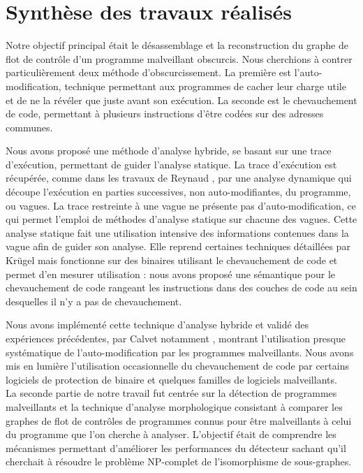 \section*{Synthèse des travaux réalisés}

Notre objectif principal était le désassemblage et la reconstruction du graphe de flot de contrôle d'un programme malveillant obscurcis.
Nous cherchions à contrer particulièrement deux méthode d'obscurcissement. 
La première est l'auto-modification, technique permettant aux programmes de cacher leur charge utile et de ne la révéler que juste avant son exécution. La seconde est le chevauchement de code, permettant à plusieurs instructions d'être codées sur des adresses communes.

Nous avons proposé une méthode d'analyse hybride, se basant sur une trace d'exécution, permettant de guider l'analyse statique.
La trace d'exécution est récupérée, comme dans les travaux de Reynaud \cite{Reynaud2010}, par une analyse dynamique qui découpe l'exécution en parties successives, non auto-modifiantes, du programme, ou vagues.
La trace restreinte à une vague ne présente pas d'auto-modification, ce qui permet l'emploi de méthodes d'analyse statique sur chacune des vagues.
Cette analyse statique fait une utilisation intensive des informations contenues dans la vague afin de guider son analyse.
Elle reprend certaines techniques détaillées par Krügel \cite{KruegelRVV04} mais fonctionne sur des binaires utilisant le chevauchement de code et permet d'en mesurer utilisation : nous avons proposé une sémantique pour le chevauchement de code rangeant les instructions dans des couches de code au sein desquelles il n'y a pas de chevauchement.

Nous avons implémenté cette technique d'analyse hybride et validé des expériences précédentes, par Calvet notamment \cite{Calvet2013}, montrant l'utilisation presque systématique de l'auto-modification par les programmes malveillants.
Nous avons mis en lumière l'utilisation occasionnelle du chevauchement de code par certains logiciels de protection de binaire et quelques familles de logiciels malveillants.
\\

La seconde partie de notre travail fut centrée sur la détection de programmes malveillants et la technique d'analyse morphologique \cite{BKM08} consistant à comparer les graphes de flot de contrôles de programmes connus pour être malveillants à celui du programme que l'on cherche à analyser.
L'objectif était de comprendre les mécanismes permettant d'améliorer les performances du détecteur sachant qu'il cherchait à résoudre le problème NP-complet de l'isomorphisme de sous-graphes.

